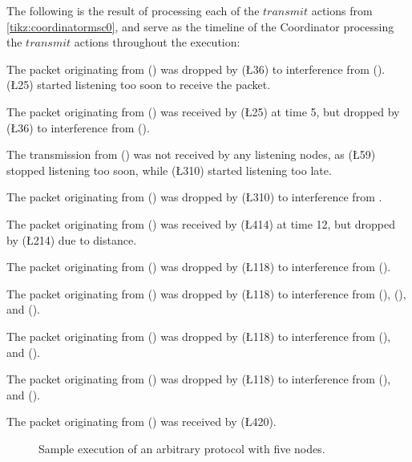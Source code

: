 The following is the result of processing each of the $transmit$ actions from \autoref{tikz:coordinatormsc0}, and serve as the timeline of the Coordinator processing the $transmit$ actions throughout the execution: %
%
\begin{description}[leftmargin=2em,style=nextline]
    \item[\T{4}{3}] The packet originating from  () was dropped by  (\L{3}{6}) to interference from  ().  (\L{2}{5}) started listening too soon to receive the packet.
    \item[\T{1}{5}] The packet originating from  () was received by  (\L{2}{5}) at time 5, but dropped by  (\L{3}{6}) to interference from  ().
    \item[\T{1}{10}] The transmission from  () was not received by any listening nodes, as  (\L{5}{9}) stopped listening too soon, while  (\L{3}{10}) started listening too late.
    \item[\T{2}{10}] The packet originating from  () was dropped by  (\L{3}{10}) to interference from .
    \item[\T{5}{12}] The packet originating from  () was received by  (\L{4}{14}) at time 12, but dropped by  (\L{2}{14}) due to distance.
    \item[\T{3}{16}] The packet originating from  () was dropped by  (\L{1}{18}) to interference from  ().
    \item[\T{4}{17}] The packet originating from  () was dropped by  (\L{1}{18}) to interference from  (),  (), and  ().
    \item[\T{2}{18}] The packet originating from  () was dropped by  (\L{1}{18}) to interference from  (), and  ().
    \item[\T{5}{18}] The packet originating from  () was dropped by  (\L{1}{18}) to interference from  (), and  ().
    \item[\T{3}{20}] The packet originating from  () was received by  (\L{4}{20}).
\end{description}

\begin{figure}[H]
    \centering
    \CoordinatorFigure{}
    \caption{Sample execution of an arbitrary protocol with five nodes.}\label{tikz:coordinatormsc0}
\end{figure}

